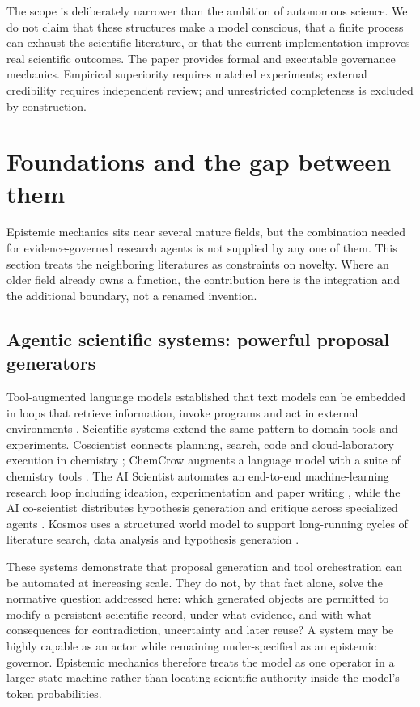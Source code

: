 The scope is deliberately narrower than the ambition of autonomous science. We do not claim that these structures make a model conscious, that a finite process can exhaust the scientific literature, or that the current implementation improves real scientific outcomes. The paper provides formal and executable governance mechanics. Empirical superiority requires matched experiments; external credibility requires independent review; and unrestricted completeness is excluded by construction.

\section{Foundations and the gap between them}

Epistemic mechanics sits near several mature fields, but the combination needed for evidence-governed research agents is not supplied by any one of them. This section treats the neighboring literatures as constraints on novelty. Where an older field already owns a function, the contribution here is the integration and the additional boundary, not a renamed invention.

\subsection{Agentic scientific systems: powerful proposal generators}

Tool-augmented language models established that text models can be embedded in loops that retrieve information, invoke programs and act in external environments \cite{lewis2020,yao2023,schick2023,mialon2023}. Scientific systems extend the same pattern to domain tools and experiments. Coscientist connects planning, search, code and cloud-laboratory execution in chemistry \cite{boiko2023}; ChemCrow augments a language model with a suite of chemistry tools \cite{bran2024}. The AI Scientist automates an end-to-end machine-learning research loop including ideation, experimentation and paper writing \cite{lu2024}, while the AI co-scientist distributes hypothesis generation and critique across specialized agents \cite{gottweis2025}. Kosmos uses a structured world model to support long-running cycles of literature search, data analysis and hypothesis generation \cite{kosmos2025}.

These systems demonstrate that proposal generation and tool orchestration can be automated at increasing scale. They do not, by that fact alone, solve the normative question addressed here: which generated objects are permitted to modify a persistent scientific record, under what evidence, and with what consequences for contradiction, uncertainty and later reuse? A system may be highly capable as an actor while remaining under-specified as an epistemic governor. Epistemic mechanics therefore treats the model as one operator in a larger state machine rather than locating scientific authority inside the model's token probabilities.

